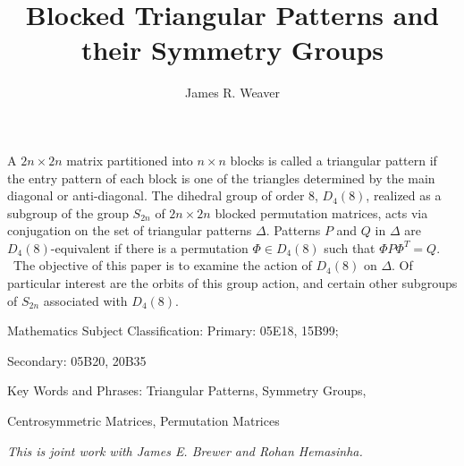 \documentclass[a4paper]{amsart}
\date{}
\begin{document}
\title{Blocked Triangular Patterns and their Symmetry Groups}
\author{James R. Weaver}
\address{University of West Florda\\
Department of Mathematic and Statistics\\
11563 Clear Creek Drive\\
Pensacola, FL 32514-9704\\
USA}
\maketitle





A $2n\times 2n$ matrix partitioned into $n\times n$ blocks is called a
triangular pattern if the entry pattern of each block is one of the
triangles determined by the main diagonal or anti-diagonal. The dihedral
group of order $8$, $D_{4}(8)$, realized as a subgroup of the group $S_{2n}$
of $2n\times 2n$ blocked permutation matrices, acts via conjugation on the
set of triangular patterns $\Delta $. Patterns $P$ and $Q$ in $\Delta $ are $%
D_{4}(8)$-equivalent if there is a permutation $\Phi \in D_{4}(8)$ such that 
$\Phi P\Phi ^{T}=Q$. \ The objective of this paper is to examine the action
of $D_{4}(8)$ on $\Delta $. Of particular interest are the orbits of this
group action, and certain other subgroups of $S_{2n}$ associated with $%
D_{4}(8)$.

\smallskip

Mathematics Subject Classification: Primary: 05E18, 15B99;

Secondary: 05B20, 20B35

Key Words and Phrases: Triangular Patterns, Symmetry Groups,

Centrosymmetric Matrices, Permutation Matrices

\emph{This is joint work with James E. Brewer and Rohan Hemasinha.}
\end{document}
